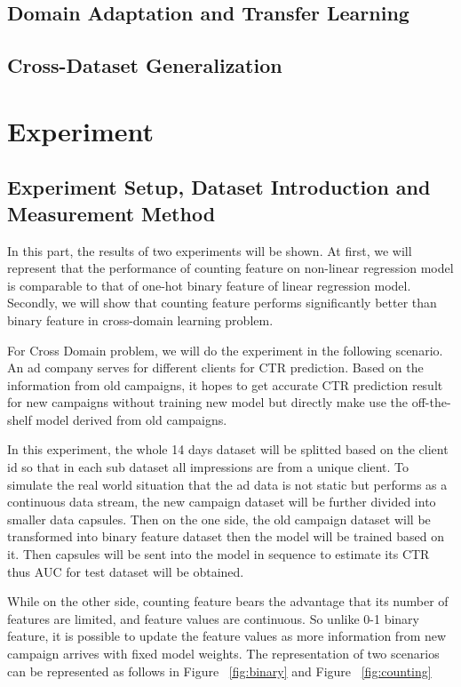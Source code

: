 \documentclass{sig-alternate}
\begin{document}
\subsection{Domain Adaptation and Transfer Learning}
\subsection{Cross-Dataset Generalization}



\section{Experiment}

\subsection{Experiment Setup, Dataset Introduction and Measurement Method}

In this part, the results of two experiments will be shown. At first, we will represent that the performance of counting feature on non-linear regression model is comparable to that of one-hot binary feature of linear regression model. Secondly, we will show that counting feature performs significantly better than binary feature in cross-domain learning problem. 

For Cross Domain problem, we will do the experiment in the following scenario. An ad company serves for different clients for CTR prediction. Based on the information from old campaigns, it hopes to get accurate CTR prediction result for new campaigns without training new model but directly make use the off-the-shelf model derived from old campaigns. \vspace{5mm}

In this experiment, the whole 14 days dataset will be splitted based on the client id so that in each sub dataset all impressions are from a unique client. To simulate the real world situation that the ad data is not static but performs as a continuous data stream, the new campaign dataset will be further divided into smaller data capsules. Then on the one side, the old campaign dataset will be transformed into binary feature dataset then the model will be trained based on it. Then capsules will be sent into the model in sequence to estimate its CTR thus AUC for test dataset will be obtained. \vspace{5mm}

While on the other side, counting feature bears the advantage that its number of features are limited, and feature values are continuous. So unlike 0-1 binary feature, it is possible to update the feature values as more information from new campaign arrives with fixed model weights. The representation of two scenarios can be represented as follows in Figure ~\ref{fig:binary} and Figure ~\ref{fig:counting}
\end{document}
